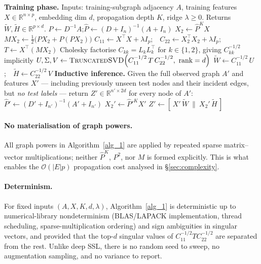 \documentclass{article}
\begin{document}
\begin{algorithm}[t]
\caption{GW-CCA: training and inductive inference}
\label{alg_1}
\begin{algorithmic}[1]
\Statex \textbf{Training phase.} Inputs: training-subgraph adjacency $A$, training features $X \in \mathbb{R}^{n \times p}$, embedding dim $d$, propagation depth $K$, ridge $\lambda \geq 0$. Returns $\widetilde{W}, \widetilde{H} \in \mathbb{R}^{p \times d}$.
\State $P \gets D^{-1} A$;\quad $\widehat{P} \gets (D + I_n)^{-1}(A + I_n)$
\State $X_2 \gets \widehat{P}^K X$ 
\State $M X_2 \gets \tfrac{1}{2}\bigl(P X_2 + P(P X_2)\bigr)$ 
\State $C_{11} \gets X^\top X + \lambda I_p$;\ \ $C_{22} \gets X_2^\top X_2 + \lambda I_p$;\ \ $T \gets X^\top (M X_2)$
\State Cholesky factorise $C_{kk} = L_k L_k^\top$ for $k \in \{1, 2\}$, giving $C_{kk}^{-1/2}$ implicitly
\State $U, \Sigma, V \gets \textsc{TruncatedSVD}\!\left(C_{11}^{-1/2}\, T\, C_{22}^{-1/2},\ \text{rank}=d\right)$
\State $\widetilde{W} \gets C_{11}^{-1/2}\, U$;\ \ $\widetilde{H} \gets C_{22}^{-1/2}\, V$ 
\Statex \textbf{Inductive inference.} Given the full observed graph $A'$ and features $X'$ --- including previously unseen test nodes and their incident edges, but \emph{no test labels} --- return $Z' \in \mathbb{R}^{n' \times 2d}$ for every node of $A'$:
\State $\widehat{P}' \gets (D' + I_{n'})^{-1}(A' + I_{n'})$
\State $X_2' \gets \widehat{P}'^K X'$ 
\State \Return $Z' \gets [\, X'\, \widetilde{W}\ \|\ X_2'\, \widetilde{H}\,]$
\end{algorithmic}
\end{algorithm}

\paragraph{No materialisation of graph powers.}
All graph powers in Algorithm~\ref{alg_1} are applied by repeated sparse
matrix--vector multiplications; neither $\widehat{P}^K$, $P^2$, nor $M$
is formed explicitly. This is what enables the $\mathcal{O}(|E| p)$
propagation cost analysed in \S\ref{sec:complexity}.

\paragraph{Determinism.}
For fixed inputs $(A, X, K, d, \lambda)$, Algorithm~\ref{alg_1} is
deterministic up to numerical-library nondeterminism (BLAS/LAPACK
implementation, thread scheduling, sparse-multiplication ordering) and
sign ambiguities in singular vectors, and provided that the top-$d$
singular values of $C_{11}^{-1/2} T C_{22}^{-1/2}$ are separated from
the rest. Unlike deep SSL, there is no random seed to sweep, no
augmentation sampling, and no variance to report.
\end{document}
